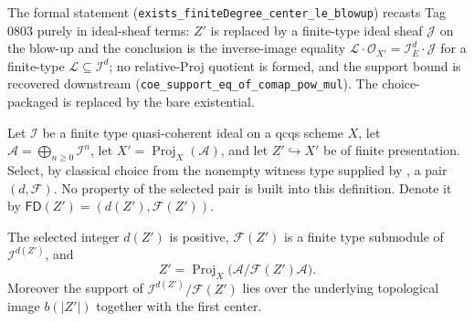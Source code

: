 \begin{remark}
  The formal statement
  (\texttt{exists\_finiteDegree\_center\_le\_blowup}) recasts Tag 0803 purely
  in ideal-sheaf terms: $Z'$ is replaced by a finite-type ideal sheaf
  $\mathcal J$ on the blow-up and the conclusion is the inverse-image
  equality $\mathcal L\cdot\mathcal O_{X'}=\mathcal I_E^d\cdot\mathcal J$ for
  a finite-type $\mathcal L\subseteq\mathcal I^d$; no relative-Proj quotient
  is formed, and the support bound is recovered downstream
  (\texttt{coe\_support\_eq\_of\_comap\_pow\_mul}).  The choice-packaged
   is replaced by the bare
  existential.
\end{remark}

\begin{definition}
  \label{def:nagata-proj-closed-center-finite-degree}
  \leanok

  Let $\mathcal I$ be a finite type quasi-coherent ideal on a qcqs scheme
  $X$, let $\mathcal A=\bigoplus_{n\geq0}\mathcal I^n$, let
  $X'=\operatorname{Proj}_X(\mathcal A)$, and let
  $Z'\hookrightarrow X'$ be of finite presentation.  Select, by classical
  choice from the nonempty witness type supplied by
  , a pair
  $(d,\mathcal F)$.  No property of the selected pair is built into this
  definition.  Denote it by
  $\mathsf{FD}(Z')=(d(Z'),\mathcal F(Z'))$.
\end{definition}

\begin{lemma}
  \label{lemma:nagata-proj-closed-center-finite-degree}
  \leanok

  The selected integer $d(Z')$ is positive, $\mathcal F(Z')$ is a finite
  type submodule of $\mathcal I^{d(Z')}$, and
  \[
    Z'=\operatorname{Proj}_X
      \bigl(\mathcal A/\mathcal F(Z')\mathcal A\bigr).
  \]
  Moreover the support of
  $\mathcal I^{d(Z')}/\mathcal F(Z')$ lies over the underlying topological
  image $b(|Z'|)$ together with the first center.
\end{lemma}

